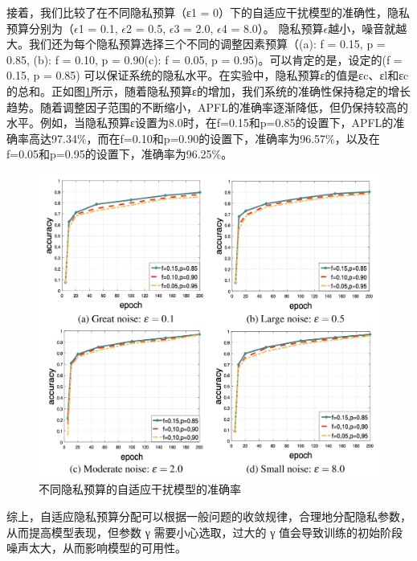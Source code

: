 接着，我们比较了在不同隐私预算（ε1 = 0）下的自适应干扰模型的准确性，隐私预算分别为（$\epsilon$1 = 0.1, $\epsilon$2 = 0.5, $\epsilon$3 = 2.0, $\epsilon$4 = 8.0）。
隐私预算$\epsilon$越小，噪音就越大。我们还为每个隐私预算选择三个不同的调整因素预算（(a): f = 0.15, p = 0.85, (b): f = 0.10, p = 0.90(c): f = 0.05, p = 0.95)。可以肯定的是，设定的(f = 0.15, p = 0.85) 可以保证系统的隐私水平。在实验中，隐私预算ε的值是εc、εl和εc的总和。正如图\ref{fig:不同隐私预算的自适应干扰机制在MINIST数据集上的准确率}所示，随着隐私预算ε的增加，我们系统的准确性保持稳定的增长趋势。随着调整因子范围的不断缩小，APFL的准确率逐渐降低，但仍保持较高的水平。例如，当隐私预算ε设置为8.0时，在f=0.15和p=0.85的设置下，APFL的准确率高达97.34$\%$，而在f=0.10和p=0.90的设置下，准确率为96.57$\%$，以及在f=0.05和p=0.95的设置下，准确率为96.25$\%$。

\begin{figure}[!hbt]
\centering
  	\includegraphics[scale=0.6]{fig2/C5/自适应干扰实验}%
	\caption{不同隐私预算的自适应干扰模型的准确率}
  	\label{fig:不同隐私预算的自适应干扰机制在MINIST数据集上的准确率} 
\end{figure}

综上，自适应隐私预算分配可以根据一般问题的收敛规律，合理地分配隐私参数，从而提高模型表现，但参数 γ 需要小心选取，过大的 γ 值会导致训练的初始阶段噪声太大，从而影响模型的可用性。

